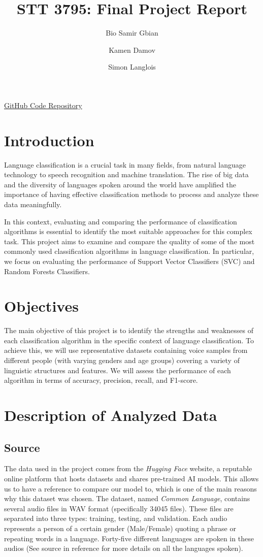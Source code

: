 \documentclass[twocolumn]{article}
\title{STT 3795: Final Project Report}
\author[1]{Bio Samir Gbian}
\author[1]{Kamen Damov}
\author[1]{Simon Langlois}
\affil{Department of Mathematics and Statistics}
\affil[1]{University of Montreal}
\begin{document}
\maketitle

\href{https://github.com/Gonxped31/Projet-STT-3795}{GitHub Code Repository}

\section{Introduction}
\label{1}
Language classification is a crucial task in many fields, from natural language technology to speech recognition and machine translation. The rise of big data and the diversity of languages spoken around the world have amplified the importance of having effective classification methods to process and analyze these data meaningfully.

In this context, evaluating and comparing the performance of classification algorithms is essential to identify the most suitable approaches for this complex task. This project aims to examine and compare the quality of some of the most commonly used classification algorithms in language classification. In particular, we focus on evaluating the performance of Support Vector Classifiers (SVC) and Random Forests Classifiers.


\section{Objectives}
\label{2}
The main objective of this project is to identify the strengths and weaknesses of each classification algorithm in the specific context of language classification. To achieve this, we will use representative datasets containing voice samples from different people (with varying genders and age groups) covering a variety of linguistic structures and features. We will assess the performance of each algorithm in terms of accuracy, precision, recall, and F1-score.

\section{Description of Analyzed Data}
\label{3}
\subsection{Source}
\label{3.1}
The data used in the project comes from the \textit{Hugging Face} website, a reputable online platform that hosts datasets and shares pre-trained AI models. This allows us to have a reference to compare our model to, which is one of the main reasons why this dataset was chosen.
The dataset, named \textit{Common Language}, contains several audio files in WAV format (specifically 34045 files). These files are separated into three types: training, testing, and validation. Each audio represents a person of a certain gender (Male/Female) quoting a phrase or repeating words in a language. Forty-five different languages are spoken in these audios (See source in reference for more details on all the languages spoken).
\end{document}
